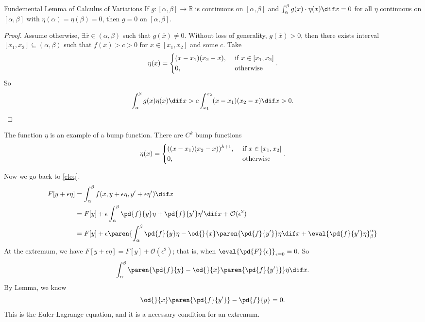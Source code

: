 \begin{lemma}{Fundemental Lemma of Calculus of Variations}{}
    If \(g: [\alpha, \beta] \to \mathbb{R}\) is continuous on \([\alpha, \beta]\) and \(\int_\alpha^\beta g(x) \cdot \eta(x) \dif x = 0\) for all \(\eta\) continuous on \([\alpha, \beta]\) with \(\eta(\alpha) = \eta(\beta) = 0\), then \(g = 0\) on \([\alpha, \beta]\).
\end{lemma}
\begin{proof}
    Assume otherwise, \(\exists \overline{x} \in (\alpha, \beta)\) such that \(g(\overline{x}) \neq 0\). Without loss of generality, \(g(\overline{x}) > 0\), then there exists interval \([x_1, x_2] \subseteq (\alpha, \beta)\) such that \(f(x) > c > 0\) for \(x \in [x_1, x_2]\) and some \(c\). Take
    \begin{equation}
        \eta(x) = \begin{dcases}
            (x-x_1)(x_2 - x), &\text{ if } x \in [x_1, x_2]\\
            0, &\text{ otherwise} \\
        \end{dcases}.
    \end{equation}
    So
    \[
        \int^\beta_\alpha g(x) \eta(x) \dif x > c \int^{x_2}_{x_1} (x - x_1)(x_2 - x) \dif x > 0.
    \]
\end{proof}
\begin{remark}
    The function \(\eta\) is an example of a bump function. There are \(C^k\) bump functions
    \[
        \eta(x) = \begin{dcases}
            ((x-x_1)(x_2 - x))^{k + 1}, &\text{ if } x \in [x_1, x_2]\\
            0, &\text{ otherwise} \\
        \end{dcases}.
    \]
\end{remark}
Now we go back to \cref{eleq}.
\begin{align*}
    F[y + \epsilon \eta] &= \int_\alpha^\beta f(x, y + \epsilon \eta, y' + \epsilon \eta') \dif x\\
    &= F[y] + \epsilon \int_\alpha^\beta \pd{f}{y} \eta + \pd{f}{y'} \eta' \dif x + \mathcal{O}(\epsilon^2)\\
    &= F[y] + \epsilon\paren{\int_\alpha^\beta \pd{f}{y} \eta - \od{}{x}\paren{\pd{f}{y'}}\eta \dif x + \eval{\pd{f}{y'}\eta}_\beta^\alpha}
\end{align*}
At the extremum, we have \(F[y + \epsilon \eta] = F[y] + \mathcal{O}(\epsilon^2)\); that is, when \(\eval{\pd{F}{\epsilon}}_{\epsilon = 0} = 0\). So
\[
    \int_\alpha^\beta \paren{\pd{f}{y} - \od{}{x}\paren{\pd{f}{y'}}} \eta \dif x.
\]
By Lemma, we know
\begin{equation}
    \od{}{x}\paren{\pd{f}{y'}} - \pd{f}{y} = 0.
    \label{eulerlag}
\end{equation}
This is the Euler-Lagrange equation, and it is a necessary condition for an extremum.

